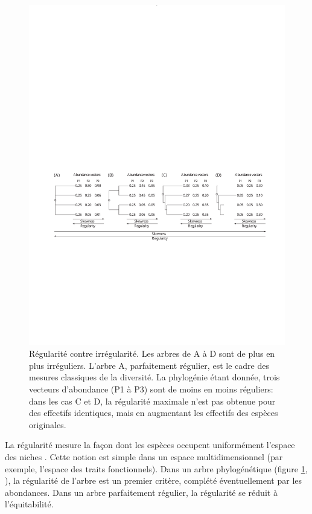 \documentclass[
  11pt,
  french,
  a4paper,
  extrafontsizes,onecolumn,openright
  ]{memoir}
\begin{document}
\begin{figure}

{\centering \includegraphics[width=0.8\linewidth]{images/Pavoine2011} 

}

\caption{Régularité contre irrégularité. Les arbres de A à D sont de plus en plus irréguliers. L'arbre A, parfaitement régulier, est le cadre des mesures classiques de la diversité. La phylogénie étant donnée, trois vecteurs d'abondance (P1 à P3) sont de moins en moins réguliers: dans les cas C et D, la régularité maximale n'est pas obtenue pour des effectifs identiques, mais en augmentant les effectifs des espèces originales.}\label{fig:Pavoine2011}
\end{figure}

\normalsize

La régularité mesure la façon dont les espèces occupent uniformément l'espace des niches \autocite{Pavoine2011}.
Cette notion est simple dans un espace multidimensionnel (par exemple, l'espace des traits fonctionnels).
Dans un arbre phylogénétique (figure \ref{fig:Pavoine2011}, \textcite{Pavoine2011}), la régularité de l'arbre \autocite{Mooers1997} est un premier critère, complété éventuellement par les abondances.
Dans un arbre parfaitement régulier, la régularité se réduit à l'équitabilité.
\end{document}
